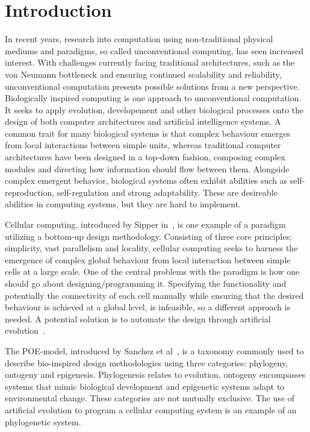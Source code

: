 
\chapter{Introduction}

In recent years, research into computation using non-traditional physical
mediums and paradigms, so called unconventional computing, has seen increased
interest. With challenges currently facing traditional architectures, such as
the von Neumann bottleneck and ensuring continued scalability and reliability,
unconventional computation presents possible solutions from a new perspective.
 Biologically inspired
computing is one approach to unconventional computation. It seeks to apply
evolution, developement and other biological processes onto the design of both
computer architectures and artificial intelligence systems. A common trait for
many biological systems is that complex behaviour emerges from local
interactions between simple units, whereas traditional computer architectures
have been designed in a top-down fashion, composing complex modules and
directing how information should flow between them. Alongside complex emergent
behavior, biological systems often exhibit abilities such as self-reproduction,
self-regulation and strong adaptability. These are desireable abilities in
computing systems, but they are hard to implement.

Cellular computing, introduced by Sipper in~\cite{Sipper1999}, is one example of
a paradigm utilizing a bottom-up design methodology. Consisting of three core
principles; simplicity, vast parallelism and locality, cellular computing seeks
to harness the emergence of complex global behaviour from local interaction
between simple cells at a large scale. One of the central problems with the
paradigm is how one should go about designing/programming it. Specifying the
functionality and potentially the connectivity of each cell manually while
ensuring that the desired behaviour is achieved at a global level, is
infeasible, so a different approach is needed. A potential solution is to
automate the design through artificial evolution~\cite{Sipper2004}.

The POE-model, introduced by Sanchez et al~\cite{Sanchez1997}, is a taxonomy
commonly used to describe bio-inspired design methodologies using three categories:
phylogeny, ontogeny and epigenesis. Phylogenesis relates to evolution, ontogeny
encompasses systems that mimic biological development and epigenetic systems
adapt to environmental change. These categories are not mutually exclusive. The
use of artificial evolution to program a cellular computing system is an example
of an phylogenetic system.

